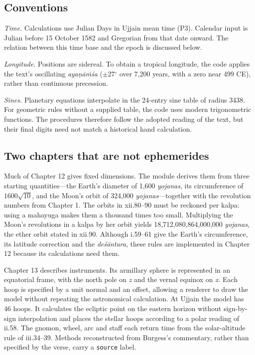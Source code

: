 \documentclass[11pt,a4paper]{article}
\begin{document}
\subsection{Conventions}
\label{sec:conventions}

\textit{Time.} Calculations use Julian Days in Ujjain mean time (P3). Calendar input is Julian before 15 October 1582 and Gregorian from that date onward. The relation between this time base and the epoch is discussed below.

\textit{Longitude.} Positions are sidereal. To obtain a tropical longitude, the code applies the text's oscillating \textit{aya\d{n}\={a}\.{m}\'{s}a} ($\pm$27$^\circ$ over 7,200 years, with a zero near 499 CE), rather than continuous precession.

\textit{Sines.} Planetary equations interpolate in the 24-entry sine table of radius 3438. For geometric rules without a supplied table, the code uses modern trigonometric functions. The procedures therefore follow the adopted reading of the text, but their final digits need not match a historical hand calculation.

\subsection{Two chapters that are not ephemerides}

Much of Chapter 12 gives fixed dimensions. The module derives them from three starting quantities---the Earth's diameter of 1,600 \textit{yojanas}, its circumference of $1600\sqrt{10}$, and the Moon's orbit of 324,000 \textit{yojanas}---together with the revolution numbers from Chapter 1. The orbits in xii.80--90 must be reckoned per kalpa: using a mahayuga makes them a thousand times too small. Multiplying the Moon's revolutions in a kalpa by her orbit yields 18,712,080,864,000,000 \textit{yojanas}, the ether orbit stated in xii.90. Although i.59--61 give the Earth's circumference, its latitude correction and the \textit{de\'{s}\={a}ntara}, these rules are implemented in Chapter 12 because its calculations need them.

Chapter 13 describes instruments. Its armillary sphere is represented in an equatorial frame, with the north pole on \textit{z} and the vernal equinox on \textit{x}. Each hoop is specified by a unit normal and an offset, allowing a renderer to draw the model without repeating the astronomical calculation. At Ujjain the model has 46 hoops. It calculates the ecliptic point on the eastern horizon without sign-by-sign interpolation and places the stellar hoops according to a polar reading of ii.58. The gnomon, wheel, arc and staff each return time from the solar-altitude rule of iii.34--39. Methods reconstructed from Burgess's commentary, rather than specified by the verse, carry a \texttt{source} label.
\end{document}
